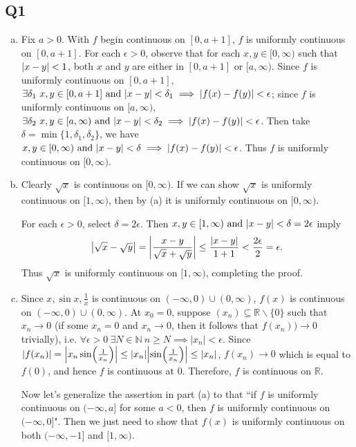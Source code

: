 \documentclass[12pt,lettersize]{article}
\newcommand{\R}{\mathbb{R}}
\newcommand{\N}{\mathbb{N}}
\begin{document}
	
	\subsection*{Q1}
	\begin{enumerate}[(a)]
		\item Fix $a>0$. With $f$ begin continuous on $[0,a+1]$, $f$ is uniformly continuous on $[0,a+1]$. For each $\epsilon>0$, observe that for each $x,y\in[0,\infty)$ such that $\abs{x-y}<1$, both $x$ and $y$ are either in $[0,a+1]$ or $[a,\infty)$. Since $f$ is uniformly continuous on $[0,a+1]$, $\exists\delta_1\ x,y\in[0,a+1]\text{ and }\abs{x-y}<\delta_1\implies \abs{f(x)-f(y)}<\epsilon$; since $f$ is uniformly continuous on $[a,\infty)$, $\exists\delta_2\ x,y\in[a,\infty)\text{ and }\abs{x-y}<\delta_2\implies \abs{f(x)-f(y)}<\epsilon$. Then take $\delta=\min\{1,\delta_1,\delta_2\}$, we have $x,y\in[0,\infty)\text{ and }\abs{x-y}<\delta\implies\abs{f(x)-f(y)}<\epsilon$. Thus $f$ is uniformly continuous on $[0,\infty)$.
		
		\item Clearly $\sqrt{x}$ is continuous on $[0,\infty)$. If we can show $\sqrt{x}$ is uniformly continuous on $[1,\infty)$, then by (a) it is uniformly continuous on $[0,\infty)$.\smallskip
		
		For each $\epsilon>0$, select $\delta=2\epsilon$. Then $x,y\in[1,\infty)\text{ and }\abs{x-y}<\delta=2\epsilon$ imply
		\begin{displaymath}
			\abs{\sqrt{x}-\sqrt{y}}=\abs{\frac{x-y}{\sqrt{x}+\sqrt{y}}}\leq\frac{\abs{x-y}}{1+1}<\frac{2\epsilon}{2}=\epsilon.
		\end{displaymath}
		Thus $\sqrt{x}$ is uniformly continuous on $[1,\infty)$, completing the proof.
		
		\item Since $x,\sin x,\frac{1}{x}$ is continuous on $(-\infty,0)\cup(0,\infty)$, $f(x)$ is continuous on $(-\infty,0)\cup(0,\infty)$. At $x_0=0$, suppose $(x_n)\subseteq\R\backslash\{0\}$ such that $x_n\rightarrow 0$ (if some $x_n=0$ and $x_n\rightarrow0$, then it follows that $f(x_n))\rightarrow0$ trivially), i.e. $\forall\epsilon>0\ \exists N\in\N\ n\geq N\implies |x_n|<\epsilon$. Since $\abs{f(x_n)}=\abs{x_n\sin(\frac{1}{x_n})}\leq\abs{x_n}\abs{\sin(\frac{1}{x_n})}\leq\abs{x_n}$, $f(x_n)\rightarrow0$ which is equal to $f(0)$, and hence $f$ is continuous at $0$. Therefore, $f$ is continuous on $\R$.\smallskip
		
		Now let's generalize the assertion in part (a) to that ``if $f$ is uniformly continuous on $(-\infty,a]$ for some $a<0$, then $f$ is uniformly continuous on $(-\infty,0]$". Then we just need to show that $f(x)$ is uniformly continuous on both $(-\infty,-1]$ and $[1,\infty)$.\smallskip
		

\end{enumerate}
\end{document}
